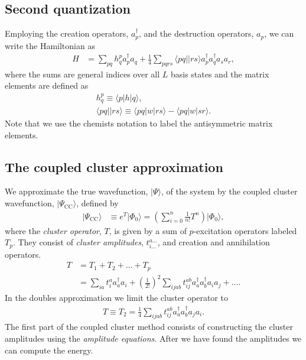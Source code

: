 \documentclass[
    a4paper, aps, twocolumn, floatfix, superscriptaddress,
    nofootinbib]{revtex4-1}
\newcommand{\1}{\mathds{1}}
\newcommand{\para}[1]{\left(#1\right)}
\newcommand{\bra}[1]{\langle #1\lvert}
\newcommand{\ket}[1]{\rvert #1\rangle}
\newcommand{\acr}[1]{a_{#1}^{\dagger}}
\newcommand{\ade}[1]{a_{#1}}
\begin{document}
    \subsection{Second quantization}
        Employing the creation operators, $\acr{p}$, and the destruction
        operators, $\ade{p}$, we can write the Hamiltonian as
        \begin{align}
            H
            &=
            \sum_{pq}h_{q}^{p}\acr{p}\ade{q}
            + \frac{1}{4}\sum_{pqrs}\bra{pq}\ket{rs}\acr{p}\acr{q}\ade{s}\ade{r},
        \end{align}
        where the sums are general indices over all $L$ basis states and the
        matrix elements are defined as
        \begin{gather}
            h^{p}_{q} \equiv \bra{p}h\ket{q}, \\
            \bra{pq}\ket{rs} \equiv \bra{pq}w\ket{rs} - \bra{pq}w\ket{sr}.
        \end{gather}
        Note that we use the chemists notation to label the antisymmetric matrix
        elements.


    \subsection{The coupled cluster approximation}
        We approximate the true wavefunction, $\ket{\Psi}$, of the system by the
        coupled cluster wavefunction, $\ket{\Psi_{\text{CC}}}$, defined by
        \begin{align}
            \ket{\Psi_{\text{CC}}}
            &\equiv e^{T}\ket{\Phi_0}
            = \para{
                \sum_{i = 0}^n
                \frac{1}{n!}T^n
            }\ket{\Phi_0},
        \end{align}
        where the \emph{cluster operator}, $T$, is given by a sum of
        $p$-excitation operators labeled $T_p$. They consist of \emph{cluster
        amplitudes}, $t_{i\dots}^{a\dots}$, and creation and annihilation
        operators.
        \begin{align}
            T &= T_1 + T_2 + \dots + T_p \\
            &=
            \sum_{ia}t_i^a\acr{a}\ade{i}
            + \para{\frac{1}{2!}}^2\sum_{ijab}
            t_{ij}^{ab}\acr{a}\acr{b}\ade{i}\ade{j}
            + \dots.
        \end{align}
        In the doubles approximation we limit the cluster operator to
        \begin{align}
            T \equiv T_2
            = \frac{1}{4}\sum_{ijab}t_{ij}^{ab}\acr{a}\acr{b}\ade{j}\ade{i}.
            \label{eq:T_2}
        \end{align}
        The first part of the coupled cluster method consists of constructing
        the cluster amplitudes using the \emph{amplitude equations}. After we
        have found the amplitudes we can compute the energy.
\end{document}
